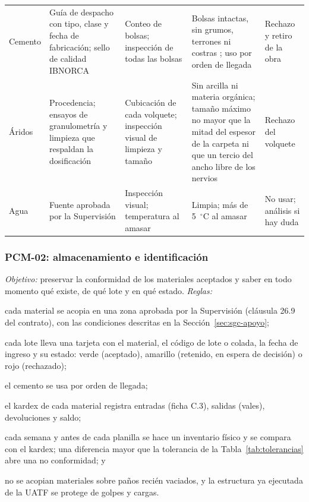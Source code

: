 \begin{longtable}{@{}P{1.9cm}P{3.4cm}P{3.7cm}P{4.2cm}P{2.1cm}@{}}
Cemento & Guía de despacho con tipo, clase y fecha de fabricación; sello de calidad IBNORCA & Conteo de bolsas; inspección de todas las bolsas & Bolsas intactas, sin grumos, terrones ni costras \parencite[p.~1]{uatf_et}; uso por orden de llegada & Rechazo y retiro de la obra \\
Áridos & Procedencia; ensayos de granulometría y limpieza que respaldan la dosificación & Cubicación de cada volquete; inspección visual de limpieza y tamaño & Sin arcilla ni materia orgánica; tamaño máximo no mayor que la mitad del espesor de la carpeta ni que un tercio del ancho libre de los nervios \parencite[p.~2]{uatf_et} & Rechazo del volquete \\
Agua & Fuente aprobada por la Supervisión & Inspección visual; temperatura al amasar & Limpia; más de 5~$^{\circ}$C al amasar \parencite[p.~2]{uatf_et} & No usar; análisis si hay duda \\
\end{longtable}
\vspace{-6pt}
\endgroup

\subsubsection{PCM-02: almacenamiento e identificación} \emph{Objetivo:} preservar la conformidad de los materiales aceptados y saber en todo momento qué existe, de qué lote y en qué estado. \emph{Reglas:}
\begin{enumerate*}[label=(\alph*)]
  \item cada material se acopia en una zona aprobada por la Supervisión (cláusula 26.9 del contrato), con las condiciones descritas en la Sección~\ref{sec:sgc-apoyo};
  \item cada lote lleva una tarjeta con el material, el código de lote o colada, la fecha de ingreso y su estado: verde (aceptado), amarillo (retenido, en espera de decisión) o rojo (rechazado);
  \item el cemento se usa por orden de llegada;
  \item el kardex de cada material registra entradas (ficha C.3), salidas (vales), devoluciones y saldo;
  \item cada semana y antes de cada planilla se hace un inventario físico y se compara con el kardex; una diferencia mayor que la tolerancia de la Tabla~\ref{tab:tolerancias} abre una no conformidad; y
  \item no se acopian materiales sobre paños recién vaciados, y la estructura ya ejecutada de la UATF se protege de golpes y cargas.
\end{enumerate*}


